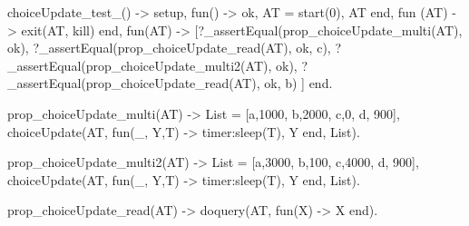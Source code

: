 \documentclass[11pt]{article}
\renewenvironment{verbatim}{}{}
\begin{document}
\begin{verbatim}
%%% Test choiceUpdate %%%
choiceUpdate_test_() ->
    {setup,
    fun() -> {ok, AT} = start(0), AT end,
    %fun () -> {ok, AT} = start(0) end,
    fun (AT) -> exit(AT, kill) end,
    fun(AT) ->
    [?_assertEqual(prop_choiceUpdate_multi(AT), ok), %Return value on success
     ?_assertEqual(prop_choiceUpdate_read(AT), {ok, c}), %Is the value actually updated to the fastest one?
     ?_assertEqual(prop_choiceUpdate_multi2(AT), ok), %Try again with another list
     ?_assertEqual(prop_choiceUpdate_read(AT), {ok, b})
    ]
    end}.

%

prop_choiceUpdate_multi(AT) ->
    List = [{a,1000}, {b,2000}, {c,0}, {d, 900}],
    choiceUpdate(AT, fun(_, {Y,T}) -> timer:sleep(T), Y end, List).

prop_choiceUpdate_multi2(AT) ->
    List = [{a,3000}, {b,100}, {c,4000}, {d, 900}],
    choiceUpdate(AT, fun(_, {Y,T}) -> timer:sleep(T), Y end, List).

prop_choiceUpdate_read(AT) ->
    doquery(AT, fun(X) -> X end).

\end{verbatim}
\end{verbatim}
\end{document}

